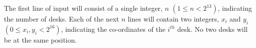 The first line of input will consist of a single integer, $n$ $(1 \le n < 2^{13})$,
indicating the number of desks. Each of the next $n$ lines will contain two integers,
$x_i$ and $y_i$ $(0 \le x_i, y_i < 2^{16})$, indicating the co-ordinates of the $i^{th}$ desk. No two desks will be at the same position.
